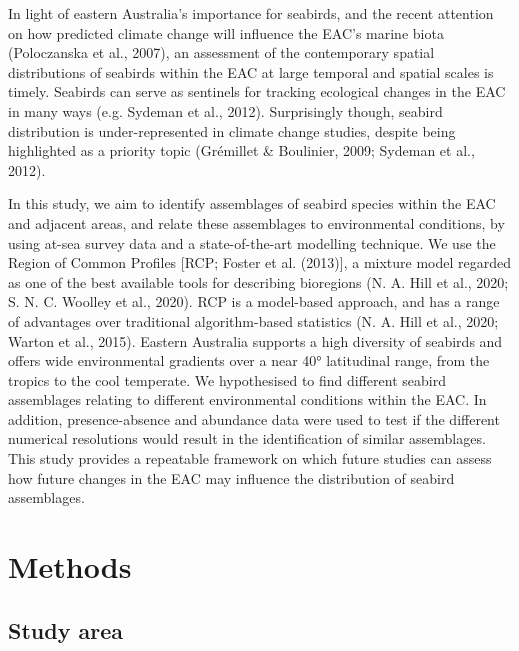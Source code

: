 \documentclass{article}
\begin{document}
\begin{linenumbers}
In light of eastern Australia's importance for seabirds, and the recent attention on how predicted climate change will influence the EAC's marine biota (Poloczanska et al., 2007), an assessment of the contemporary spatial distributions of seabirds within the EAC at large temporal and spatial scales is timely. Seabirds can serve as sentinels for tracking ecological changes in the EAC in many ways (e.g. Sydeman et al., 2012). Surprisingly though, seabird distribution is under-represented in climate change studies, despite being highlighted as a priority topic (Grémillet \& Boulinier, 2009; Sydeman et al., 2012).

In this study, we aim to identify assemblages of seabird species within the EAC and adjacent areas, and relate these assemblages to environmental conditions, by using at-sea survey data and a state-of-the-art modelling technique. We use the Region of Common Profiles {[}RCP; Foster et al. (2013){]}, a mixture model regarded as one of the best available tools for describing bioregions (N. A. Hill et al., 2020; S. N. C. Woolley et al., 2020). RCP is a model-based approach, and has a range of advantages over traditional algorithm-based statistics (N. A. Hill et al., 2020; Warton et al., 2015). Eastern Australia supports a high diversity of seabirds and offers wide environmental gradients over a near 40° latitudinal range, from the tropics to the cool temperate. We hypothesised to find different seabird assemblages relating to different environmental conditions within the EAC. In addition, presence-absence and abundance data were used to test if the different numerical resolutions would result in the identification of similar assemblages. This study provides a repeatable framework on which future studies can assess how future changes in the EAC may influence the distribution of seabird assemblages.

\hypertarget{methods}{%
\section{Methods}\label{methods}}

\hypertarget{study-area}{%
\subsection{Study area}\label{study-area}}


\end{linenumbers}
\end{document}
